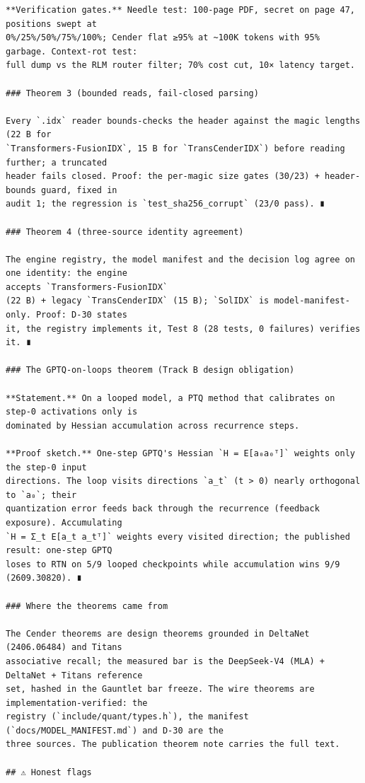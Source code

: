 \begin{Verbatim}[breaklines,breakanywhere,fontsize=\footnotesize]
**Verification gates.** Needle test: 100-page PDF, secret on page 47, positions swept at
0%/25%/50%/75%/100%; Cender flat ≥95% at ~100K tokens with 95% garbage. Context-rot test:
full dump vs the RLM router filter; 70% cost cut, 10× latency target.

### Theorem 3 (bounded reads, fail-closed parsing)

Every `.idx` reader bounds-checks the header against the magic lengths (22 B for
`Transformers-FusionIDX`, 15 B for `TransCenderIDX`) before reading further; a truncated
header fails closed. Proof: the per-magic size gates (30/23) + header-bounds guard, fixed in
audit 1; the regression is `test_sha256_corrupt` (23/0 pass). ∎

### Theorem 4 (three-source identity agreement)

The engine registry, the model manifest and the decision log agree on one identity: the engine
accepts `Transformers-FusionIDX`
(22 B) + legacy `TransCenderIDX` (15 B); `SolIDX` is model-manifest-only. Proof: D-30 states
it, the registry implements it, Test 8 (28 tests, 0 failures) verifies it. ∎

### The GPTQ-on-loops theorem (Track B design obligation)

**Statement.** On a looped model, a PTQ method that calibrates on step-0 activations only is
dominated by Hessian accumulation across recurrence steps.

**Proof sketch.** One-step GPTQ's Hessian `H = E[a₀a₀ᵀ]` weights only the step-0 input
directions. The loop visits directions `a_t` (t > 0) nearly orthogonal to `a₀`; their
quantization error feeds back through the recurrence (feedback exposure). Accumulating
`H = Σ_t E[a_t a_tᵀ]` weights every visited direction; the published result: one-step GPTQ
loses to RTN on 5/9 looped checkpoints while accumulation wins 9/9 (2609.30820). ∎

### Where the theorems came from

The Cender theorems are design theorems grounded in DeltaNet (2406.06484) and Titans
associative recall; the measured bar is the DeepSeek-V4 (MLA) + DeltaNet + Titans reference
set, hashed in the Gauntlet bar freeze. The wire theorems are implementation-verified: the
registry (`include/quant/types.h`), the manifest (`docs/MODEL_MANIFEST.md`) and D-30 are the
three sources. The publication theorem note carries the full text.

## ⚠️ Honest flags


\end{Verbatim}
